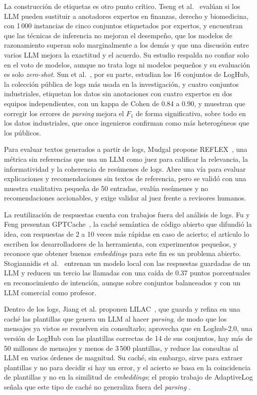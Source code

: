 La construcción de etiquetas es otro punto crítico. Tseng et al.~\cite{tseng2025_expert_annotators} evalúan si los LLM pueden sustituir a anotadores expertos en finanzas, derecho y biomedicina, con 1\,000 instancias de cinco conjuntos etiquetados por expertos, y encuentran que las técnicas de inferencia no mejoran el desempeño, que los modelos de razonamiento superan solo marginalmente a los demás y que una discusión entre varios LLM mejora la exactitud y el acuerdo. Su estudio respalda no confiar solo en el voto de modelos, aunque no trata logs ni modelos pequeños y su evaluación es solo \textit{zero-shot}. Sun et al.~\cite{sun2026_parsing}, por su parte, estudian los 16 conjuntos de LogHub, la colección pública de logs más usada en la investigación, y cuatro conjuntos industriales, etiquetan los datos sin anotaciones con cuatro expertos en dos equipos independientes, con un kappa de Cohen de 0.84 a 0.90, y muestran que corregir los errores de \textit{parsing} mejora el $F_1$ de forma significativa, sobre todo en los datos industriales, que once ingenieros confirman como más heterogéneos que los públicos.

Para evaluar textos generados a partir de logs, Mudgal propone REFLEX~\cite{mudgal2025_reflex}, una métrica sin referencias que usa un LLM como juez para calificar la relevancia, la informatividad y la coherencia de resúmenes de logs. Abre una vía para evaluar explicaciones y recomendaciones sin textos de referencia, pero se validó con una muestra cualitativa pequeña de 50 entradas, evalúa resúmenes y no recomendaciones accionables, y exige validar al juez frente a revisores humanos.

La reutilización de respuestas cuenta con trabajos fuera del análisis de logs. Fu y Feng presentan GPTCache~\cite{fu2023_gptcache}, la caché semántica de código abierto que difundió la idea, con respuestas de 2 a 10 veces más rápidas en caso de acierto; el artículo lo escriben los desarrolladores de la herramienta, con experimentos pequeños, y reconoce que obtener buenos \textit{embeddings} para este fin es un problema abierto. Stogiannidis et al.~\cite{stogiannidis2023_cache} entrenan un modelo local con las respuestas guardadas de un LLM y reducen un tercio las llamadas con una caída de 0.37 puntos porcentuales en reconocimiento de intención, aunque sobre conjuntos balanceados y con un LLM comercial como profesor.

Dentro de los logs, Jiang et al. proponen LILAC~\cite{jiang2024_lilac}, que guarda y refina en una caché las plantillas que genera un LLM al hacer \textit{parsing}, de modo que los mensajes ya vistos se resuelven sin consultarlo; aprovecha que en Loghub-2.0, una versión de LogHub con las plantillas correctas de 14 de sus conjuntos, hay más de 50 millones de mensajes y menos de 3\,500 plantillas, y reduce las consultas al LLM en varios órdenes de magnitud. Su caché, sin embargo, sirve para extraer plantillas y no para decidir si hay un error, y el acierto se basa en la coincidencia de plantillas y no en la similitud de \textit{embeddings}; el propio trabajo de AdaptiveLog señala que este tipo de caché no generaliza fuera del \textit{parsing} \cite{ma2026_adaptivelog}.

